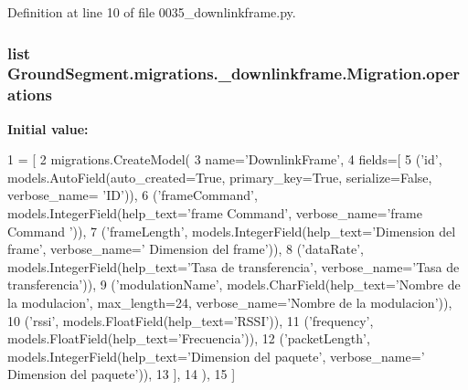 Definition at line 10 of file 0035\+\_\+downlinkframe.\+py.

\hypertarget{class_ground_segment_1_1migrations_1_10035__downlinkframe_1_1_migration_ace17035a4f8c8a057c08fa1dd2a182d7}{}
\subsubsection[{operations}]{\setlength{\rightskip}{0pt plus 5cm}list Ground\+Segment.\+migrations.\+\_\+downlinkframe.\+Migration.\+operations\hspace{0.3cm}{\ttfamily [static]}}\label{class_ground_segment_1_1migrations_1_10035__downlinkframe_1_1_migration_ace17035a4f8c8a057c08fa1dd2a182d7}
{\bfseries Initial value\+:}
\begin{DoxyCode}
1 = [
2         migrations.CreateModel(
3             name=\textcolor{stringliteral}{'DownlinkFrame'},
4             fields=[
5                 (\textcolor{stringliteral}{'id'}, models.AutoField(auto\_created=\textcolor{keyword}{True}, primary\_key=\textcolor{keyword}{True}, serialize=\textcolor{keyword}{False}, verbose\_name=\textcolor{stringliteral}{
      'ID'})),
6                 (\textcolor{stringliteral}{'frameCommand'}, models.IntegerField(help\_text=\textcolor{stringliteral}{'frame Command'}, verbose\_name=\textcolor{stringliteral}{'frame Command
      '})),
7                 (\textcolor{stringliteral}{'frameLength'}, models.IntegerField(help\_text=\textcolor{stringliteral}{'Dimension del frame'}, verbose\_name=\textcolor{stringliteral}{'
      Dimension del frame'})),
8                 (\textcolor{stringliteral}{'dataRate'}, models.IntegerField(help\_text=\textcolor{stringliteral}{'Tasa de transferencia'}, verbose\_name=\textcolor{stringliteral}{'Tasa de
       transferencia'})),
9                 (\textcolor{stringliteral}{'modulationName'}, models.CharField(help\_text=\textcolor{stringliteral}{'Nombre de la modulacion'}, max\_length=24, 
      verbose\_name=\textcolor{stringliteral}{'Nombre de la modulacion'})),
10                 (\textcolor{stringliteral}{'rssi'}, models.FloatField(help\_text=\textcolor{stringliteral}{'RSSI'})),
11                 (\textcolor{stringliteral}{'frequency'}, models.FloatField(help\_text=\textcolor{stringliteral}{'Frecuencia'})),
12                 (\textcolor{stringliteral}{'packetLength'}, models.IntegerField(help\_text=\textcolor{stringliteral}{'Dimension del paquete'}, verbose\_name=\textcolor{stringliteral}{'
      Dimension del paquete'})),
13             ],
14         ),
15     ]
\end{DoxyCode}



